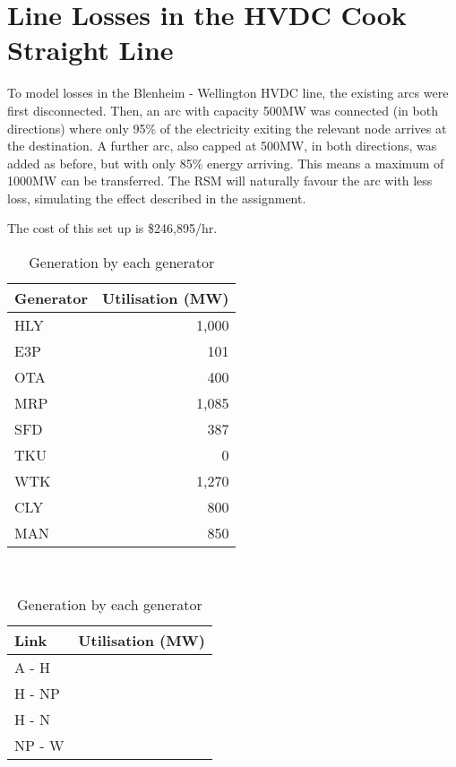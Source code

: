 \documentclass[11pt]{article}
\begin{document}
\section{Line Losses in the HVDC Cook Straight Line}
To model losses in the Blenheim - Wellington HVDC line, the existing arcs were first disconnected. Then, an arc with capacity 500MW was connected (in both directions) where only 95\% of the electricity exiting the relevant node arrives at the destination. A further arc, also capped at 500MW, in both directions, was added as before, but with only 85\% energy arriving. This means a maximum of 1000MW can be transferred. The RSM will naturally favour the arc with less loss, simulating the effect described in the assignment. 

The cost of this set up is \$246,895/hr. 

\begin{table}[h]
	\begin{minipage}{0.5\linewidth}
		\centering
		\begin{tabular}{@{}lr@{}}
		\toprule
		Generator & Utilisation (MW)  \\ \midrule
		HLY       & 1,000             \\
		E3P       & 101               \\
		OTA       & 400               \\
		MRP       & 1,085             \\
		SFD       & 387               \\
		TKU       & 0                 \\
		WTK       & 1,270             \\
		CLY       & 800               \\
		MAN       & 850               \\ \bottomrule
		\end{tabular}
		\caption{Generation by each generator}
	\end{minipage}
	~
	\begin{minipage}{0.5\linewidth}
		\centering
		\begin{tabular}{@{}lr@{}}
		\toprule
		Link & Utilisation (MW) \\ \midrule
		A - H       & \color{red}{$-451$}          \\ %
		H - NP      & \color{red}{$-196.75$}       \\ %
		H - N       & \color{ForestGreen}{$108.75$}\\ %
		NP - W      & \color{ForestGreen}{$130.25$}\\ %

\end{tabular}
\end{minipage}
\end{table}
\end{document}

